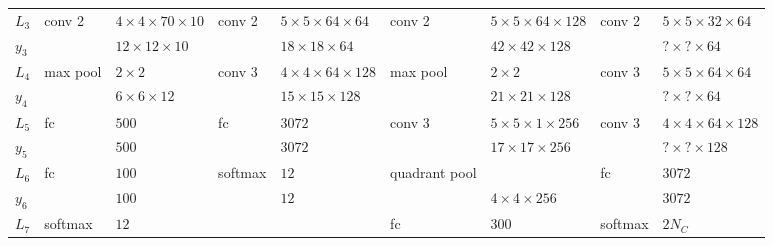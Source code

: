 \begin{landscape}
\begin{table}[h!]
{\begin{tabular}{|lllllllll|}
\multicolumn{1}{|l|}{$L_3$}   & conv 2   & \multicolumn{1}{l|}{$4\times 4\times70\times 10$}  & conv 2   & \multicolumn{1}{l|}{$5 \times 5 \times 64\times64$}  & conv 2        & \multicolumn{1}{l|}{$5\times5\times64\times128$} & conv 2    & $5\times5\times32\times64$     \\
\multicolumn{1}{|l|}{$y_3$}   &          & \multicolumn{1}{l|}{$12\times 12 \times 10$}       &          & \multicolumn{1}{l|}{$18 \times 18\times64$}          &               & \multicolumn{1}{l|}{$42\times42\times128$}       &           & $?\times?\times64$             \\ \hline
\multicolumn{1}{|l|}{$L_4$}   & max pool & \multicolumn{1}{l|}{$2\times 2$}                   & conv 3   & \multicolumn{1}{l|}{$4\times 4 \times64 \times 128$} & max pool      & \multicolumn{1}{l|}{$2\times2$}                  & conv 3    & $5\times5\times64\times64$     \\
\multicolumn{1}{|l|}{$y_4$}   &          & \multicolumn{1}{l|}{$6\times 6 \times 12$}         &          & \multicolumn{1}{l|}{$15\times15\times128$}           &               & \multicolumn{1}{l|}{$21\times21\times128$}       &           & $?\times?\times64$             \\ \hline
\multicolumn{1}{|l|}{$L_5$}   & fc       & \multicolumn{1}{l|}{$500$}                         & fc       & \multicolumn{1}{l|}{$3072$}                          & conv 3        & \multicolumn{1}{l|}{$5\times5\times1\times256$}  & conv 3    & $4\times4\times64\times128$    \\
\multicolumn{1}{|l|}{$y_5$}   &          & \multicolumn{1}{l|}{$500$}                         &          & \multicolumn{1}{l|}{$3072$}                          &               & \multicolumn{1}{l|}{$17\times17\times256$}       &           & $?\times?\times128$            \\ \hline
\multicolumn{1}{|l|}{$L_6$}   & fc       & \multicolumn{1}{l|}{$100$}                         & softmax  & \multicolumn{1}{l|}{$12$}                            & quadrant pool & \multicolumn{1}{l|}{}                            & fc        & $3072$                         \\
\multicolumn{1}{|l|}{$y_6$}   &          & \multicolumn{1}{l|}{$100$}                         &          & \multicolumn{1}{l|}{$12$}                            &               & \multicolumn{1}{l|}{$4\times4\times256$}         &           & $3072$                         \\ \hline
\multicolumn{1}{|l|}{$L_7$}   & softmax  & \multicolumn{1}{l|}{$12$}                          &          & \multicolumn{1}{l|}{}                                & fc            & \multicolumn{1}{l|}{$300$}                       & softmax   & $2N_{C}$                       \\

\end{tabular}}
\end{table}
\end{landscape}

